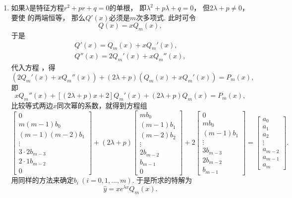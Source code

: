 \begin{enumerate}
	\item 如果\(\lambda\)是特征方程\(r^2+pr+q=0\)的单根，
	即\(\lambda^2+p\lambda+q=0\)，
	但\(2\lambda+p\neq0\)，
	要使  的两端恒等，
	那么\(Q'(x)\)必须是\(m\)次多项式.
	此时可令\begin{equation*}
		Q(x) = x Q_m(x),
	\end{equation*}
	于是\begin{gather*}
		Q'(x) = Q_m(x) + x Q_m'(x), \\
		Q''(x) = 2 Q_m'(x) + x Q_m''(x),
	\end{gather*}
	代入方程 ，得\begin{equation*}
		(2 Q_m'(x) + x Q_m''(x))
		+ (2\lambda+p) (Q_m(x) + x Q_m'(x))
		= P_m(x),
	\end{equation*}
	即\begin{equation*}
		x Q_m''(x) + [(2\lambda+p)x+2] Q_m'(x)
		+ (2\lambda+p) Q_m(x)
		= P_m(x),
	\end{equation*}
	比较等式两边\(x\)同次幂的系数，就得到方程组\begin{equation*}
		\begin{bmatrix}
			0 \\ m(m-1) b_0 \\ (m-1)(m-2) b_1 \\ \vdots \\
			3\cdot2 b_{m-3} \\ 2\cdot1 b_{m-2} \\ 0
		\end{bmatrix}
		+ (2\lambda+p)
		\begin{bmatrix}
			m b_0 \\ (m-1) b_1 \\ (m-2) b_2 \\ \vdots \\
			2 b_{m-2} \\ b_{m-1} \\ 0
		\end{bmatrix}
		+ 2 \begin{bmatrix}
			0 \\ m b_0 \\ (m-1) b_1 \\ \vdots \\
			3 b_{m-3} \\ 2 b_{m-2} \\ b_{m-1}
		\end{bmatrix}
		= \begin{bmatrix}
			a_0 \\ a_1 \\ a_2 \\ \vdots \\
			a_{m-2} \\ a_{m-1} \\ a_m
		\end{bmatrix}.
	\end{equation*}
	用同样的方法来确定\(b_i\ (i=0,1,\dotsc,m)\).
	于是所求的特解为\begin{equation}
		\hat{y} = x e^{\lambda x} Q_m(x).
	\end{equation}


\end{enumerate}
